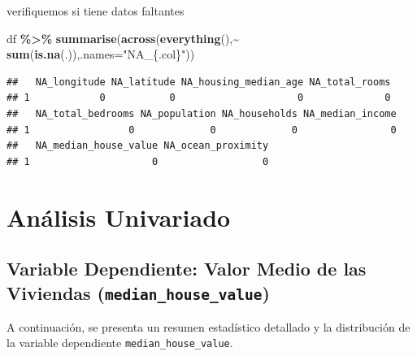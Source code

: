\documentclass[
]{book}
\newenvironment{Shaded}{\begin{snugshade}}{\end{snugshade}}
\newcommand{\AttributeTok}[1]{\textcolor[rgb]{0.13,0.29,0.53}{#1}}
\newcommand{\FunctionTok}[1]{\textcolor[rgb]{0.13,0.29,0.53}{\textbf{#1}}}
\newcommand{\NormalTok}[1]{#1}
\newcommand{\OtherTok}[1]{\textcolor[rgb]{0.56,0.35,0.01}{#1}}
\newcommand{\SpecialCharTok}[1]{\textcolor[rgb]{0.81,0.36,0.00}{\textbf{#1}}}
\newcommand{\StringTok}[1]{\textcolor[rgb]{0.31,0.60,0.02}{#1}}
\begin{document}
verifiquemos si tiene datos faltantes

\begin{Shaded}
\begin{Highlighting}[]
\NormalTok{df }\SpecialCharTok{\%\textgreater{}\%} 
   \FunctionTok{summarise}\NormalTok{(}\FunctionTok{across}\NormalTok{(}\FunctionTok{everything}\NormalTok{(),}\SpecialCharTok{\textasciitilde{}} \FunctionTok{sum}\NormalTok{(}\FunctionTok{is.na}\NormalTok{(.)),}\AttributeTok{.names=}\StringTok{"NA\_\{.col\}"}\NormalTok{))}
\end{Highlighting}
\end{Shaded}

\begin{verbatim}
##   NA_longitude NA_latitude NA_housing_median_age NA_total_rooms
## 1            0           0                     0              0
##   NA_total_bedrooms NA_population NA_households NA_median_income
## 1                 0             0             0                0
##   NA_median_house_value NA_ocean_proximity
## 1                     0                  0
\end{verbatim}

\begin{Shaded}
\end{Shaded}

\section{Análisis Univariado}\label{anuxe1lisis-univariado}

\subsection{\texorpdfstring{Variable Dependiente: Valor Medio de las Viviendas (\texttt{median\_house\_value})}{Variable Dependiente: Valor Medio de las Viviendas (median\_house\_value)}}\label{variable-dependiente-valor-medio-de-las-viviendas-median_house_value}

A continuación, se presenta un resumen estadístico detallado y la distribución de la variable dependiente \texttt{median\_house\_value}.
\end{document}
